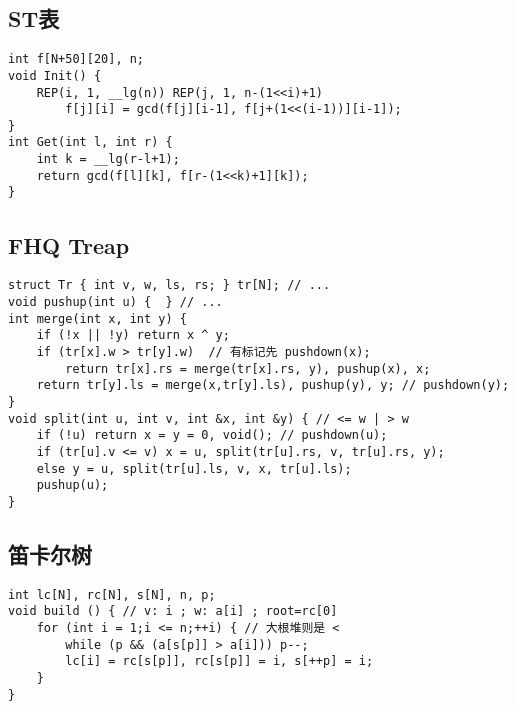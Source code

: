 \documentclass[a4paper,landscape,twocolumn]{ctexart}
\begin{document}
\subsection{ST表}

\begin{lstlisting}
int f[N+50][20], n;
void Init() {
	REP(i, 1, __lg(n)) REP(j, 1, n-(1<<i)+1)
		f[j][i] = gcd(f[j][i-1], f[j+(1<<(i-1))][i-1]);
}
int Get(int l, int r) {
	int k = __lg(r-l+1);
	return gcd(f[l][k], f[r-(1<<k)+1][k]);
}
\end{lstlisting}

\subsection{FHQ \space Treap}

\begin{lstlisting}
struct Tr { int v, w, ls, rs; } tr[N]; // ...
void pushup(int u) {  } // ...
int merge(int x, int y) {
	if (!x || !y) return x ^ y;
	if (tr[x].w > tr[y].w)  // 有标记先 pushdown(x);
		return tr[x].rs = merge(tr[x].rs, y), pushup(x), x;
	return tr[y].ls = merge(x,tr[y].ls), pushup(y), y; // pushdown(y);
}
void split(int u, int v, int &x, int &y) { // <= w | > w
	if (!u) return x = y = 0, void(); // pushdown(u);
	if (tr[u].v <= v) x = u, split(tr[u].rs, v, tr[u].rs, y);
	else y = u, split(tr[u].ls, v, x, tr[u].ls);
	pushup(u);
}
\end{lstlisting}

\subsection{笛卡尔树}

\begin{lstlisting}
int lc[N], rc[N], s[N], n, p;
void build () { // v: i ; w: a[i] ; root=rc[0]
	for (int i = 1;i <= n;++i) { // 大根堆则是 <
		while (p && (a[s[p]] > a[i])) p--;
		lc[i] = rc[s[p]], rc[s[p]] = i, s[++p] = i;
	}
}
\end{lstlisting}
\end{document}
